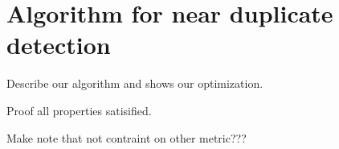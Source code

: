 \section*{Algorithm for near duplicate detection}
\label{section:luciv}
Describe our algorithm and shows our optimization.

Proof all properties satisified.

Make note that not contraint on other metric???